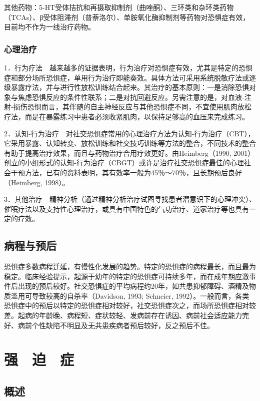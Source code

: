 其他药物：5-HT受体拮抗和再摄取抑制剂（曲唑酮）、三环类和杂环类药物（TCAs）、β受体阻滞剂（普萘洛尔）、单胺氧化酶抑制剂等药物对恐惧症有效，目前均不作为一线治疗药物。

\subsubsection{心理治疗}

1．行为疗法　越来越多的证据表明，行为治疗对恐惧症有效，尤其是特定的恐惧症和部分场所恐惧症，单用行为治疗即能奏效。具体方法可采用系统脱敏疗法或逐级暴露疗法，并与进行性放松训练结合起来。其治疗的基本原则：一是消除恐惧对象与焦虑恐惧反应的条件性联系；二是对抗回避反应。另需注意的是，对血液-注射-损伤恐惧而言，其伴随的自主神经反应与其他恐惧症不同，不宜使用肌肉放松疗法，而是在暴露练习中患者必须收紧肌肉，以保持足够高的血压来完成练习。

2．认知-行为治疗　对社交恐惧症常用的心理治疗方法为认知-行为治疗（CBT），它采用暴露、认知转变、放松训练和社交技巧训练等方法的整合，不同技术的整合有助于提高治疗效果，而且与药物治疗合用疗效更好。由Heimberg（1990,
2001）创立的小组形式的认知-行为治疗（CBGT）或许是治疗社交恐惧症最佳的心理社会干预方法，已有的资料表明，其有效率一般为45％～70％，且长期预后良好（Heimberg,
1998）。

3．其他治疗　精神分析（通过精神分析治疗试图寻找患者潜意识下的心理冲突）、催眠疗法以及支持性心理治疗，或具有中国特色的气功治疗、道家治疗等也具有一定的疗效。

\subsection{病程与预后}

恐惧症多数病程迁延，有慢性化发展的趋势。特定的恐惧症的病程最长，而且最为稳定。临床经验提示，起源于幼年的特定的恐惧症可持续多年，而在成年期应激事件后出现的预后较好。社交恐惧症的平均病程约20年，如共患抑郁障碍、酒精及物质滥用可导致较高的自杀率（Davidson,
1993; Schneier,
1992）。一般而言，各类恐惧症中的预后以特定的恐惧症相对较好，社交恐惧症次之，而场所恐惧症相对较差。起病的年龄晚、病程短、症状较轻、发病前存在诱因、病前社会适应能力完好、病前个性缺陷不明显及无共患疾病者预后较好，反之预后不佳。

\section{强　迫　症}

\subsection{概述}

